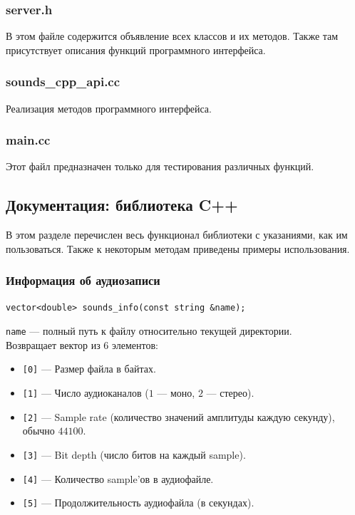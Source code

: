 \documentclass[14pt,a4paper]{article}
\begin{document}
\subsubsection*{server.h}

В этом файле содержится объявление всех классов и их методов. Также там присутствует описания функций программного интерфейса.

\subsubsection*{sounds\_cpp\_api.cc}

Реализация методов программного интерфейса.

\subsubsection*{main.cc}

Этот файл предназначен только для тестирования различных функций.

\subsection{Документация: библиотека C++}


В этом разделе перечислен весь функционал библиотеки с указаниями, как им пользоваться. Также к некоторым методам приведены примеры использования.

\subsubsection*{Информация об аудиозаписи}

\begin{lstlisting}
vector<double> sounds_info(const string &name);
\end{lstlisting}

\lstinline{name} --- полный путь к файлу относительно текущей директории. \\

\noindent Возвращает вектор из $6$ элементов:
\smallskip 
\begin{itemize}
\item[] \lstinline{[0]} --- Размер файла в байтах.
\item[] \lstinline{[1]} --- Число аудиоканалов ($1$ --- моно, $2$ --- стерео).
\item[] \lstinline{[2]} --- Sample rate (количество значений амплитуды каждую секунду), обычно $44100$.
\item[] \lstinline{[3]} --- Bit depth (число битов на каждый sample).
\item[] \lstinline{[4]} --- Количество sample'ов в аудиофайле.
\item[] \lstinline{[5]} --- Продолжительность аудиофайла (в секундах).
\end{itemize}
\end{document}
